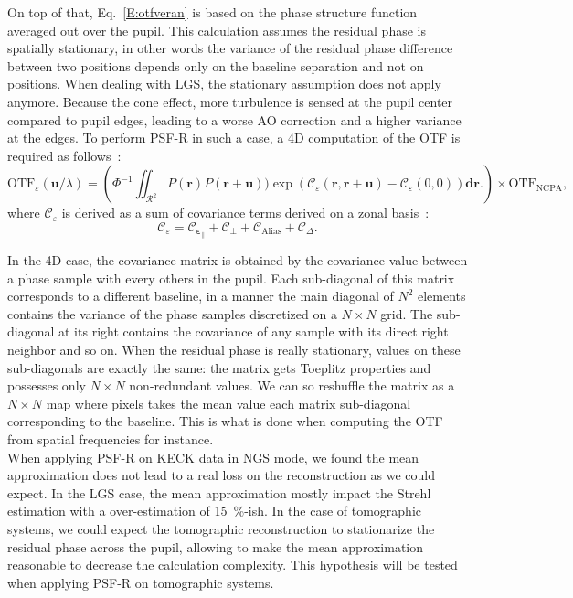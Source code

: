 \documentclass[12pt]{article}
\newcommand{\para}[1]{\left(#1\right)}
\newcommand{\rbb}{\boldsymbol{r}}
\newcommand{\otf}[1]{\text{OTF}_{#1}}
\newcommand{\epspara}{\boldsymbol{\varepsilon}_\parallel}
\begin{document}
On top of that, Eq.~\ref{E:otfveran} is based on the phase structure function averaged out over the pupil. This calculation assumes the residual phase is spatially stationary, in other words the variance of the residual phase difference between two positions depends only on the baseline separation and not on positions.  When dealing with LGS, the stationary assumption does not apply anymore. Because the cone effect, more turbulence is sensed at the pupil center compared to pupil edges, leading to a worse AO correction and a higher variance at the edges. To perform PSF-R in such a case, a 4D computation of the OTF is required as follows~:
\begin{equation}
		\otf{\varepsilon}(\boldsymbol{u}/\lambda) = \para{\Phi^{-1}\iint_{\mathcal{R}^2} P(\rbb)P(\rbb+ \boldsymbol{u}))\exp(\mathcal{C}_{\varepsilon}(\rbb,\rbb + \boldsymbol{u}) - \mathcal{C}_{\varepsilon}(0,0) )\boldsymbol{d}\rbb.} \times \otf{\text{NCPA}},
\end{equation}
where $\mathcal{C}_{\varepsilon}$ is derived as a sum of covariance terms derived on a zonal basis~:
\begin{equation}
\mathcal{C}_{\varepsilon} = \mathcal{C}_{\epspara} + \mathcal{C}_{\perp} + \mathcal{C}_{\text{Alias}} + \mathcal{C}_\Delta.
\end{equation}

In the 4D case, the covariance matrix is obtained by the covariance value between a phase sample with every others in the pupil. Each sub-diagonal of this matrix corresponds to a different baseline, in a manner the main diagonal of $N^2$ elements contains the variance of the phase samples discretized on a $N\times N$ grid. The sub-diagonal at its right contains the covariance of any sample with its direct right neighbor and so on. When the residual phase is really stationary, values on these sub-diagonals are exactly the same: the matrix gets Toeplitz properties and possesses only $N\times N$ non-redundant values. We can so reshuffle the matrix as a $N\times N$ map where pixels takes the mean value each matrix sub-diagonal corresponding to the baseline. This is what is done when computing the OTF from spatial frequencies for instance.\\

When applying PSF-R on KECK data in NGS mode, we found the mean approximation does not lead to a real loss on the reconstruction as we could expect. In the LGS case, the mean approximation mostly impact the Strehl estimation with a over-estimation of 15~\%-ish. In the case of tomographic systems, we could expect the tomographic reconstruction to stationarize the residual phase across the pupil, allowing to make the mean approximation reasonable to decrease the calculation complexity. This hypothesis will be tested when applying PSF-R on tomographic systems.\\
\end{document}
